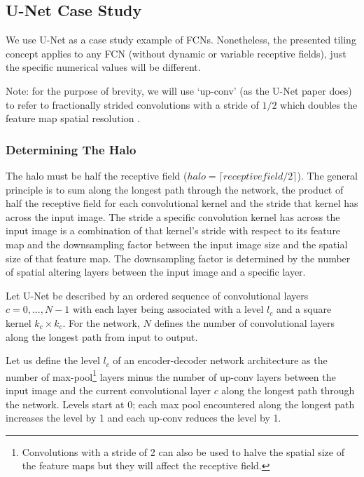 \documentclass[10pt, indentfirst]{article}
\begin{document}
\subsection{U-Net Case Study}

We use U-Net \citep{Ronneberger2015a} as a case study example of FCNs.
Nonetheless, the presented tiling concept applies to any FCN (without dynamic or variable receptive fields), just the specific numerical values will be different.

Note: for the purpose of brevity, we will use `up-conv' (as the U-Net paper does) to refer to fractionally strided convolutions with a stride of $1/2$ which doubles the feature map spatial resolution \citep{Dumoulin2018}.

\subsubsection{Determining The Halo}

The halo must be half the receptive field ($halo = \lceil receptive field / 2 \rceil$).
The general principle is to sum along the longest path through the network, the product of half the receptive field for each convolutional kernel and the stride that kernel has across the input image.
The stride a specific convolution kernel has across the input image is a combination of that kernel's stride with respect to its feature map and the downsampling factor between the input image size and the spatial size of that feature map.
The downsampling factor is determined by the number of spatial altering layers between the input image and a specific layer.

Let U-Net be described by an ordered sequence of convolutional layers $c={0, ..., N-1}$ with each layer being associated with a level $l_{c}$ and a square kernel $k_{c} \times k_{c}$.
For the network, $N$ defines the number of convolutional layers along the longest path from input to output.

Let us define the level $l_{c}$ of an encoder-decoder network architecture as the number of max-pool\footnote{Convolutions with a stride of 2 can also be used to halve the spatial size of the feature maps but they will affect the receptive field.} layers minus the number of up-conv layers between the input image and the current convolutional layer $c$ along the longest path through the network.
Levels start at 0; each max pool encountered along the longest path increases the level by 1 and each up-conv reduces the level by 1.
\end{document}
